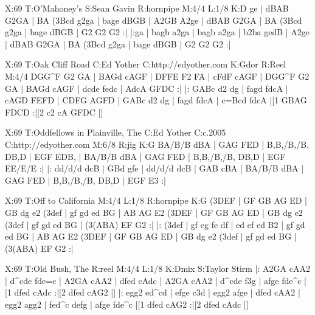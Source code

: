\documentclass[letterpaper]{article}
\begin{document}
\begin{abc}[name]
X:69
T:O'Mahoney's
S:Sean Gavin
R:hornpipe
M:4/4
L:1/8
K:D
ge | dBAB G2GA | BA (3Bcd g2ga | bage dBGB | A2GB A2ge |
dBAB G2GA | BA (3Bcd g2ga | bage dBGB | G2 G2 G2 :|
|:ga | bagb a2ga | bagb a2ga | b2ba gedB | A2ge | 
dBAB G2GA | BA (3Bcd g2ga | bage dBGB | G2 G2 G2 :|
\end{abc}

\begin{abc}[name]
X:69
T:Oak Cliff Road
C:Ed Yother
C:http://edyother.com
K:Gdor
R:Reel
M:4/4
DGG^F G2 GA | BAGd cAGF | DFFE F2 FA | cFdF cAGF |
DGG^F G2 GA | BAGd cAGF | dcde fedc | AdcA GFDC :|
|: GABc d2 dg | fagd fdcA | cAGD FEFD | CDFG AGFD |
GABc d2 dg | fagd fdcA | c=Bcd fdcA |[1 GBAG FDCD :|[2 c2 cA GFDC |]
\end{abc}

\begin{abc}[name]
X:69
T:Oddfellows in Plainville, The
C:Ed Yother
C:c.2005
C:http://edyother.com
M:6/8
R:jig
K:G
BA/B/B dBA | GAG FED | B,B,/B,/B, DB,D | EGF EDB, |
BA/B/B dBA | GAG FED | B,B,/B,/B, DB,D | EGF EE/E/E :|
|: dd/d/d dcB | GBd gfe | dd/d/d dcB | GAB cBA |
BA/B/B dBA | GAG FED | B,B,/B,/B, DB,D | EGF E3 :|
\end{abc}

\begin{abc}[name]
X:69
T:Off to California
M:4/4
L:1/8
R:hornpipe
K:G
(3DEF | GF GB AG ED | GB dg e2 (3def | gf gd ed BG | AB AG E2 (3DEF |
GF GB AG ED | GB dg e2 (3def | gf gd ed BG | (3(ABA) EF G2 :|
|: (3def | gf eg fe df | ed ef ed B2 | gf gd ed BG | AB AG E2 (3DEF |
GF GB AG ED | GB dg e2 (3def | gf gd ed BG | (3(ABA) EF G2 :|
\end{abc}

\begin{abc}[name]
X:69
T:Old Bush, The
R:reel
M:4/4
L:1/8
K:Dmix
S:Taylor Stirm
|: A2GA cAA2 | d^cde fde=c | A2GA cAA2 | dfed cAdc |
A2GA cAA2 | d^cde f3g | afge fde^c |[1 dfed cAdc :|[2 dfed cAG2 |]
|: egg2 ed^cd | efge c3d | egg2 afge | dfed cAA2 |
egg2 agg2 | fed^c defg | afge fde^c |[1 dfed cAG2 :|[2 dfed cAdc |]
\end{abc}
\end{document}
